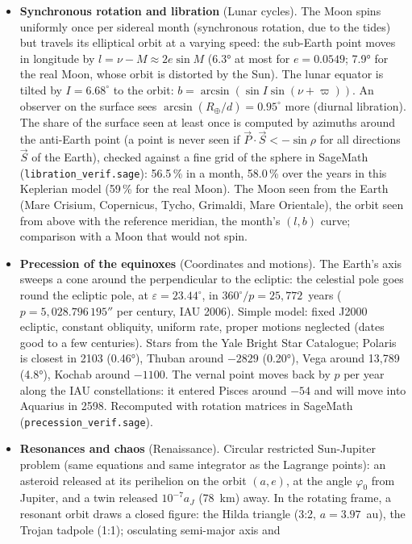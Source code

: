 \begin{itemize}
\item \textbf{Synchronous rotation and libration} (Lunar cycles). The Moon spins uniformly once per sidereal month
(synchronous rotation, due to the tides) but travels its elliptical orbit at a varying speed: the sub-Earth point moves
in longitude by $l=\nu-M\approx2e\sin M$ (6.3° at most for $e=0.0549$; 7.9° for the real Moon, whose orbit is distorted
by the Sun). The lunar equator is tilted by $I=6.68^\circ$ to the orbit: $b=\arcsin(\sin I\sin(\nu+\varpi))$. An
observer on the surface sees $\arcsin(R_\oplus/d)=0.95^\circ$ more (diurnal libration). The share of the surface seen at
least once is computed by azimuths around the anti-Earth point (a point is never seen if $\vec P\cdot\vec S<-\sin\rho$
for all directions $\vec S$ of the Earth), checked against a fine grid of the sphere in SageMath
(\texttt{libration\_verif.sage}): 56.5\,\% in a month, 58.0\,\% over the years in this Keplerian model (59\,\% for the
real Moon). The Moon seen from the Earth (Mare Crisium, Copernicus, Tycho, Grimaldi, Mare Orientale), the orbit seen
from above with the reference meridian, the month's $(l,b)$ curve; comparison with a Moon that would not spin.
\item \textbf{Precession of the equinoxes} (Coordinates and motions). The Earth's axis sweeps a cone around the
perpendicular to the ecliptic: the celestial pole goes round the ecliptic pole, at $\varepsilon=23.44^\circ$, in
$360^\circ/p=25{,}772$~years ($p=5{,}028.796\,195''$ per century, IAU 2006). Simple model: fixed J2000 ecliptic, constant
obliquity, uniform rate, proper motions neglected (dates good to a few centuries). Stars from the Yale Bright Star
Catalogue; Polaris is closest in 2103 (0.46°), Thuban around $-2829$ (0.20°), Vega around 13{,}789 (4.8°), Kochab
around $-1100$. The vernal point moves back by $p$ per year along the IAU constellations: it entered Pisces around
$-54$ and will move into Aquarius in 2598. Recomputed with rotation matrices in SageMath (\texttt{precession\_verif.sage}).
\item \textbf{Resonances and chaos} (Renaissance). Circular restricted Sun-Jupiter problem (same equations and same
integrator as the Lagrange points): an asteroid released at its perihelion on the orbit $(a,e)$, at the angle
$\varphi_0$ from Jupiter, and a twin released $10^{-7}a_J$ (78~km) away. In the rotating frame, a resonant orbit draws
a closed figure: the Hilda triangle (3:2, $a=3.97$~au), the Trojan tadpole (1:1); osculating semi-major axis and

\end{itemize}
